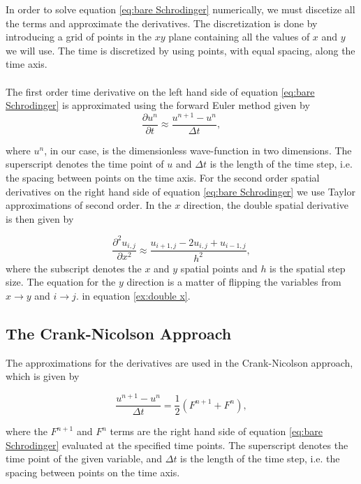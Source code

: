 \documentclass[english,notitlepage,reprint,nofootinbib]{revtex4-2}  %
\begin{document}
	\noindent
	In order to solve equation \ref{eq:bare Schrodinger} numerically, we must discetize all the terms and approximate
	the derivatives. The discretization is done by introducing a grid of points in the
	$xy$ plane containing all the values of $x$ and $y$ we will use. The time is discretized by using points, with equal spacing, along the time axis.\\ \\
	The first order time derivative on the left hand side of equation \ref{eq:bare Schrodinger} is approximated using the forward Euler method given by
	\begin{equation}
		\frac{\partial u^{n}}{\partial t} \approx \frac{u^{n+1}-u^n}{\Delta t},
	\end{equation}

	\noindent
	where $u^n$, in our case, is the dimensionless wave-function in two dimensions.
	The superscript denotes the time point of $u$ and $\Delta t$ is the length of the time
	step, i.e. the spacing between points on the time axis.	For the second order spatial derivatives
	on the right hand side of equation \ref{eq:bare Schrodinger}
	we use Taylor approximations of second order. In the $x$ direction,
	the double spatial derivative is then given by
	
	\begin{equation}\label{ex:double x}
		\frac{\partial^2 u_{i,j}}{\partial x^2} \approx \frac{u_{i+1,j}-2u_{i,j}+u_{i-1,j}}{h^2},
	\end{equation}
	where the subscript denotes the $x$ and $y$ spatial points and $h$ is the spatial step size.
	The equation for the $y$ direction is a matter of flipping the variables from
	$x \rightarrow y$ and $i \rightarrow j$.
	in equation \ref{ex:double x}.
	\subsection{The Crank-Nicolson Approach}
	
	\noindent
	The approximations for the derivatives are used in
	the Crank-Nicolson approach, which is given by
	
	\begin{equation}
		\frac{u^{n+1}-u^{n}}{\Delta t} = \frac{1}{2}    \left(     F^{n+1} + F^n     \right),
	\end{equation}

	\noindent
	where the $F^{n+1}$ and $F^n$ terms are the right hand side of equation \ref{eq:bare Schrodinger}
	evaluated at the specified time points. The superscript denotes the time point of the given variable, and $\Delta t$ is the length of the time step,
	i.e. the spacing between points on the time axis.\\ \\
\end{document}
